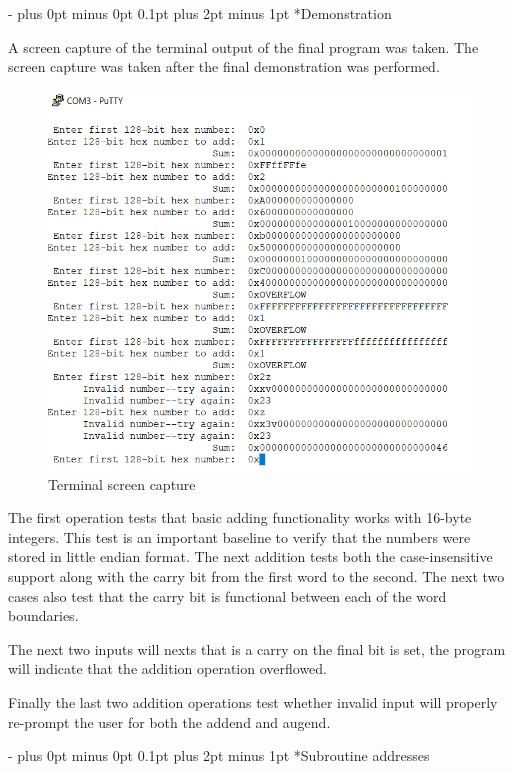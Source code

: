 \documentclass[\FontSize\FontUnit,letterpaper,oneside]{article}
\makeatletter
\renewcommand \section{
    \@startsection{section}{1}{\z@}
      {\dimexpr \FontSize\FontUnit * 2 - \parskip \relax plus 0pt minus 0pt}
      {0.1pt plus 2pt minus 1pt} %
      {\normalfont\normalsize\bfseries}}
\makeatother
\begin{document}
\section*{Demonstration}

A screen capture of the terminal output of the final program was taken. The screen capture was taken after the final demonstration was performed.

\begin{figure}[h!]
	\centering
	\includegraphics{capture}
	\caption{Terminal screen capture}
	\label{fig:capture1}
\end{figure}

The first operation tests that basic adding functionality works with 16-byte integers. This test is an important baseline to verify that the numbers were stored in little endian format. The next addition tests both the case-insensitive support along with the carry bit from the first word to the second. The next two cases also test that the carry bit is functional between each of the word boundaries.

The next two inputs will nexts that is a carry on the final bit is set, the program will indicate that the addition operation overflowed.

Finally the last two addition operations test whether invalid input will properly re-prompt the user for both the addend and augend.

\section*{Subroutine addresses}
\end{document}
